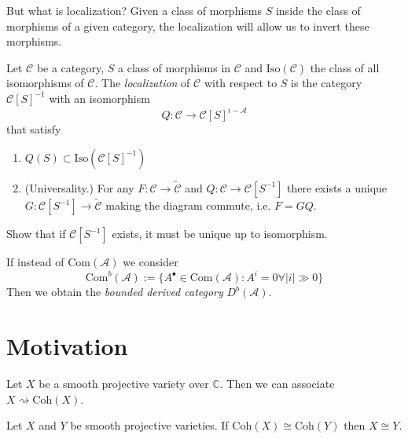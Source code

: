 But what is localization? Given a class of
morphisms $S$ inside the class of morphisms
of a given category, the localization will
allow us to invert these morphisms.

\begin{definition}
\label{definition-localization-of-category}
Let $\mathcal{C}$ be a category, $S$ a class
of morphisms in $\mathcal{C}$ and
$\text{Iso}(\mathcal{C})$ the class of all
isomorphisms of $\mathcal{C}$. The {\it
localization} of $\mathcal{C}$ with respect
to $S$ is the category $\mathcal{C}[S]^{-1}$
with an isomorphism
$$
Q:\mathcal{C}\to
\mathcal{C}[S]^{i-\mathcal{A}}
$$
that satisfy
\begin{enumerate}
\item $Q(S) \subset
\text{Iso}(\mathcal{C}[S]^{-1})$
\item (Universality.) For any
$F:\mathcal{C}\to \tilde{\mathcal{C}}$ and
$Q:\mathcal{C}\to \mathcal{C}[S^{-1}]$ there
exists a unique $G:\mathcal{C}[S^{-1}]\to
\tilde{ \mathcal{C}}$ making the diagram
commute, i.e. $F=GQ$.
\end{enumerate}
\end{definition}

\begin{exercise}
\label{exercise-uniqueness-of-localization}
Show that if $\mathcal{C}[S^{-1}]$ exists, it
must be unique up to isomorphism.
\end{exercise}

\begin{definition}
\label{definition-bounded-derived-category}
If instead of $\text{Com}(\mathcal{A})$ we
consider
$$
\text{Com}^b(\mathcal{A}):=\{A^{\bullet} \in
\text{Com}(\mathcal{A}):
A^i=0\forall  |i|\gg 0\}
$$
Then we obtain the {\it bounded derived
category} $D^b(\mathcal{A})$.
\end{definition}

\section{Motivation}
\label{section-motivation}

Let $X$ be a smooth projective variety over
$\mathbb{C}$. Then we can associate
$X\rightsquigarrow \text{Coh}(X)$.

\begin{theorem}[Gabriel]
\label{theorem-Gabriel}
Let $X$ and $Y$ be smooth projective
varieties. If $\text{Coh}(X)\cong
\text{Coh}(Y)$ then $X\cong Y$.
\end{theorem}

